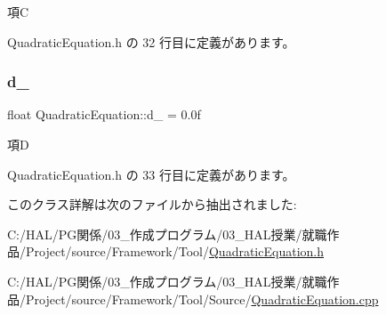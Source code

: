 項C 



 Quadratic\+Equation.\+h の 32 行目に定義があります。

\mbox{\label{class_quadratic_equation_a1fe06575641054bdf707bc2c6321a91d}} 
\subsubsection{\texorpdfstring{d\+\_\+}{d\_}}
{\footnotesize\ttfamily float Quadratic\+Equation\+::d\+\_\+ = 0.\+0f\hspace{0.3cm}{\ttfamily [private]}}



項D 



 Quadratic\+Equation.\+h の 33 行目に定義があります。



このクラス詳解は次のファイルから抽出されました\+:\begin{DoxyCompactItemize}
\item 
C\+:/\+H\+A\+L/\+P\+G関係/03\+\_\+作成プログラム/03\+\_\+\+H\+A\+L授業/就職作品/\+Project/source/\+Framework/\+Tool/\mbox{\hyperlink{_quadratic_equation_8h}{Quadratic\+Equation.\+h}}\item 
C\+:/\+H\+A\+L/\+P\+G関係/03\+\_\+作成プログラム/03\+\_\+\+H\+A\+L授業/就職作品/\+Project/source/\+Framework/\+Tool/\+Source/\mbox{\hyperlink{_quadratic_equation_8cpp}{Quadratic\+Equation.\+cpp}}\end{DoxyCompactItemize}
